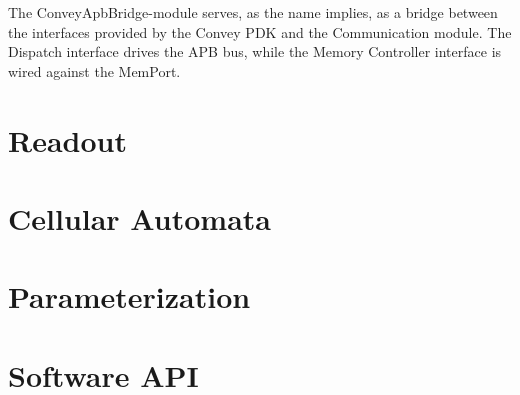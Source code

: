 The ConveyApbBridge-module serves, as the name implies, as a bridge between the
interfaces provided by the Convey PDK and the Communication module. The Dispatch
interface drives the APB bus, while the Memory Controller interface is wired
against the MemPort.


\clearpage


\section{Readout}

\section{Cellular Automata}

\section{Parameterization}

\section{Software API}

\cleardoublepage
